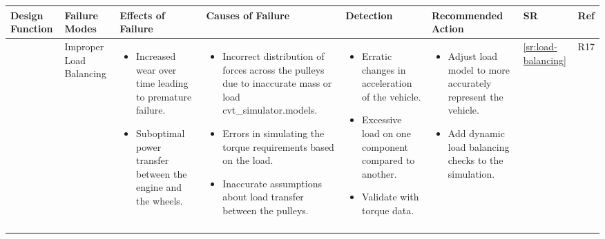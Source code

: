 \documentclass{article}
\begin{document}
\begin{table}[ht]
    \centering
    \setlength{\tabcolsep}{3pt} %
    \renewcommand{\arraystretch}{1.5} %
    \begin{tabular}{|>{\centering\arraybackslash}m{1.5cm}|>{\centering\arraybackslash}m{1.75cm}|>{\centering\arraybackslash}m{3.25cm}|>{\arraybackslash}m{5cm}|>{\centering\arraybackslash}m{3.65cm}|>{\centering\arraybackslash}m{3cm}|>{\centering\arraybackslash}m{0.65cm}|>{\centering\arraybackslash}m{0.82cm}|}
    \hline
    \textbf{Design Function} & \textbf{Failure Modes} & \textbf{Effects of Failure} & \textbf{Causes of Failure} & \textbf{Detection} & \textbf{Recommended Action} & \textbf{SR} & \textbf{Ref} \\ \hline
    
    {Simulates the CVT system} %
    & Improper Load Balancing
    & \begin{itemize}[left=0pt]
        \item Increased wear over time leading to premature failure.
        \item Suboptimal power transfer between the engine and the wheels.
    \end{itemize} 
    & \begin{itemize}[left=0pt]
        \item Incorrect distribution of forces across the pulleys due to inaccurate mass or load cvt_simulator.models.
        \item Errors in simulating the torque requirements based on the load.
        \item Inaccurate assumptions about load transfer between the pulleys.
    \end{itemize} 
    & \begin{itemize}[left=0pt]
        \item Erratic changes in acceleration of the vehicle.
        \item Excessive load on one component compared to another.
        \item Validate with torque data.
    \end{itemize} & 
    \begin{itemize}[left=0pt]
        \item Adjust load model to more accurately represent the vehicle.
        \item Add dynamic load balancing checks to the simulation.
    \end{itemize} 
    & \ref{sr:load-balancing}  & R17 \\ \cline{2-8} 
    

\end{tabular}
\end{table}
\end{document}
